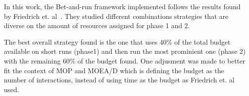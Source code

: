 In this work, the Bet-and-run framework implemented follows the results found  by Friedrich et. al~\cite{friedrich2017generic}. They studied different combinations strategies that are diverse on the amount of resources assigned for phase 1 and 2. 

The best overall strategy found is the one that uses 40\% of the total budget available on short runs (phase1) and then run the most prominient one (phase 2) with the remaining 60\% of the budget found. One adjusment was made to better fit the context of MOP and MOEA/D which is defining the budget as the number of interactions, instead of using time as the budget as Friedrich et. al used.



%